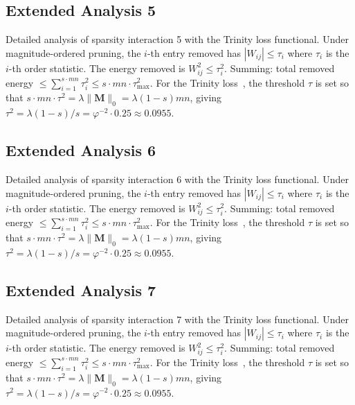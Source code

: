 \subsection{Extended Analysis 5}
\label{subsec:ext-5}

Detailed analysis of sparsity interaction 5 with the Trinity
loss functional.  Under magnitude-ordered pruning, the $i$-th entry removed has
$|W_{ij}| \leq \tau_i$ where $\tau_i$ is the $i$-th order statistic.  The
energy removed is $W_{ij}^2 \leq \tau_i^2$.  Summing: total removed energy
$\leq \sum_{i=1}^{s \cdot mn} \tau_i^2 \leq s \cdot mn \cdot \tau_{\max}^2$.
For the Trinity loss~\cite{hanetal2015deep}, the threshold $\tau$ is set so that
$s \cdot mn \cdot \tau^2 = \lambda \|\mathbf{M}\|_0 = \lambda (1-s) mn$, giving
$\tau^2 = \lambda(1-s)/s = \varphi^{-2} \cdot 0.25 \approx 0.0955$.


\subsection{Extended Analysis 6}
\label{subsec:ext-6}

Detailed analysis of sparsity interaction 6 with the Trinity
loss functional.  Under magnitude-ordered pruning, the $i$-th entry removed has
$|W_{ij}| \leq \tau_i$ where $\tau_i$ is the $i$-th order statistic.  The
energy removed is $W_{ij}^2 \leq \tau_i^2$.  Summing: total removed energy
$\leq \sum_{i=1}^{s \cdot mn} \tau_i^2 \leq s \cdot mn \cdot \tau_{\max}^2$.
For the Trinity loss~\cite{hanetal2015deep}, the threshold $\tau$ is set so that
$s \cdot mn \cdot \tau^2 = \lambda \|\mathbf{M}\|_0 = \lambda (1-s) mn$, giving
$\tau^2 = \lambda(1-s)/s = \varphi^{-2} \cdot 0.25 \approx 0.0955$.


\subsection{Extended Analysis 7}
\label{subsec:ext-7}

Detailed analysis of sparsity interaction 7 with the Trinity
loss functional.  Under magnitude-ordered pruning, the $i$-th entry removed has
$|W_{ij}| \leq \tau_i$ where $\tau_i$ is the $i$-th order statistic.  The
energy removed is $W_{ij}^2 \leq \tau_i^2$.  Summing: total removed energy
$\leq \sum_{i=1}^{s \cdot mn} \tau_i^2 \leq s \cdot mn \cdot \tau_{\max}^2$.
For the Trinity loss~\cite{hanetal2015deep}, the threshold $\tau$ is set so that
$s \cdot mn \cdot \tau^2 = \lambda \|\mathbf{M}\|_0 = \lambda (1-s) mn$, giving
$\tau^2 = \lambda(1-s)/s = \varphi^{-2} \cdot 0.25 \approx 0.0955$.


